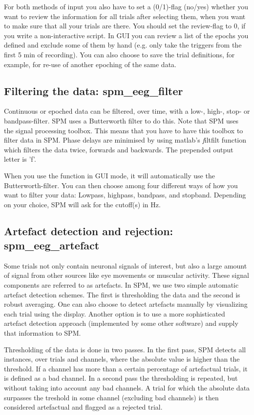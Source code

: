 For both methods of input you also have to set a (0/1)-flag (no/yes) whether you 
want to review the information for all trials after selecting them, when you want
to make sure that all your trials are there. You should set the review-flag to 0,
if you write a non-interactive script. In GUI you can review a list of the epochs you defined
and exclude some of them by hand (e.g. only take the triggers from the first 5 min of recording).
You can also choose to save the trial definitions, for example, for re-use of another epoching of the same data.

\subsection{Filtering the data: spm\_eeg\_filter}
Continuous or epoched data can be filtered, over time, with a low-,
high-, stop- or bandpass-filter. SPM uses a Butterworth filter to do this. Note that
SPM uses the signal processing toolbox. This means that you have to
have this toolbox to filter data in SPM. Phase delays are minimised by
using matlab's {\textit filtfilt} function which filters the data
twice, forwards and backwards. The prepended output letter is 'f'.

When you use the function in GUI mode, it will automatically 
use the Butterworth-filter. You can then choose among four different 
ways of how you want to filter your data: Lowpass, highpass, bandpass,
and stopband. Depending on your choice, SPM will ask for the cutoff(s) in Hz.


\subsection{Artefact detection and rejection: spm\_eeg\_artefact}
Some trials not only contain neuronal signals of
interest, but also a large amount of signal from other sources like
eye movements or muscular activity. These signal components are
referred to as artefacts. In SPM, we use two simple automatic
artefact detection schemes. The first is thresholding the data and the
second is robust averaging. One can also choose to detect artefacts
manually by visualizing each trial using the display. Another option
is to use a more sophisticated artefact detection approach
(implemented by some other software) and supply that information to
SPM. 

Thresholding of the data is done in two passes. In the first pass, SPM
detects all instances, over trials and channels, where the
absolute value is higher than the threshold. If a channel has more
than a certain percentage of artefactual trials, it is defined as a
bad channel. In a second pass the thresholding is repeated, but
without taking into account any bad channels. A trial for which the
absolute data surpasses the treshold in some channel (excluding bad
channels) is then considered artefactual and flagged as a rejected
trial.

